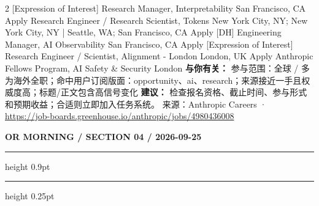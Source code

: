 \documentclass[10.5pt]{ctexart}
\begin{document}
\begin{multicols}{2}
[Expression of Interest] Research Manager, Interpretability San Francisco, CA Apply Research Engineer / Research Scientist, Tokens New York City, NY; New York City, NY | Seattle, WA; San Francisco, CA Apply [DH] Engineering Manager, AI Observability San Francisco, CA Apply [Expression of Interest] Research Engineer / Scientist, Alignment - London London, UK Apply Anthropic Fellows Program, AI Safety \& Security London
\textbf{与你有关：} 参与范围：全球 / 多为海外全职；命中用户订阅版面：opportunity、ai、research；来源接近一手且权威度高；标题/正文包含高信号变化
\textbf{建议：} 检查报名资格、截止时间、参与形式和预期收益；合适则立即加入任务系统。
{\footnotesize\color{ormuted} 来源：Anthropic Careers · \url{https://job-boards.greenhouse.io/anthropic/jobs/4980436008}}
\end{multicols}
\newpage
{\small\bfseries OR MORNING / SECTION 04 / 2026-09-25}
\vspace{2mm}
\hrule height 0.9pt
\vspace{1.5mm}
\hrule height 0.25pt
\vspace{4mm}
\end{document}
